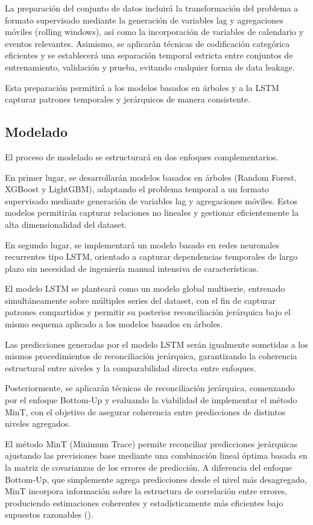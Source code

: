 \documentclass[IB,BIB]{TFUOC}%
\begin{document}
La preparación del conjunto de datos incluirá la transformación del
problema a formato supervisado mediante la generación de variables lag y
agregaciones móviles (rolling windows), así como la incorporación de
variables de calendario y eventos relevantes. Asimismo, se aplicarán
técnicas de codificación categórica eficientes y se establecerá una
separación temporal estricta entre conjuntos de entrenamiento,
validación y prueba, evitando cualquier forma de data leakage.

Esta preparación permitirá a los modelos basados en árboles y a la LSTM
capturar patrones temporales y jerárquicos de manera consistente.

\subsection{Modelado}

El proceso de modelado se estructurará en dos enfoques complementarios.

En primer lugar, se desarrollarán modelos basados en árboles (Random
Forest, XGBoost y LightGBM), adaptando el problema temporal a un formato
supervisado mediante generación de variables lag y agregaciones móviles.
Estos modelos permitirán capturar relaciones no lineales y gestionar
eficientemente la alta dimensionalidad del dataset.

En segundo lugar, se implementará un modelo basado en redes neuronales
recurrentes tipo LSTM, orientado a capturar dependencias temporales de
largo plazo sin necesidad de ingeniería manual intensiva de
características.

El modelo LSTM se planteará como un modelo global multiserie, entrenado
simultáneamente sobre múltiples series del dataset, con el fin de
capturar patrones compartidos y permitir su posterior reconciliación
jerárquica bajo el mismo esquema aplicado a los modelos basados en
árboles.

Las predicciones generadas por el modelo LSTM serán igualmente sometidas
a los mismos procedimientos de reconciliación jerárquica, garantizando
la coherencia estructural entre niveles y la comparabilidad directa
entre enfoques.

Posteriormente, se aplicarán técnicas de reconciliación jerárquica,
comenzando por el enfoque Bottom-Up y evaluando la viabilidad de
implementar el método MinT, con el objetivo de asegurar coherencia entre
predicciones de distintos niveles agregados.

El método MinT (Minimum Trace) permite reconciliar predicciones
jerárquicas ajustando las previsiones base mediante una combinación lineal óptima basada en la matriz de covarianzas de los errores de predicción. A diferencia del enfoque Bottom-Up, que simplemente
agrega predicciones desde el nivel más desagregado, MinT incorpora
información sobre la estructura de correlación entre errores,
produciendo estimaciones coherentes y estadísticamente más eficientes
bajo supuestos razonables (\cite{wickramasuriya2019}).
\end{document}
